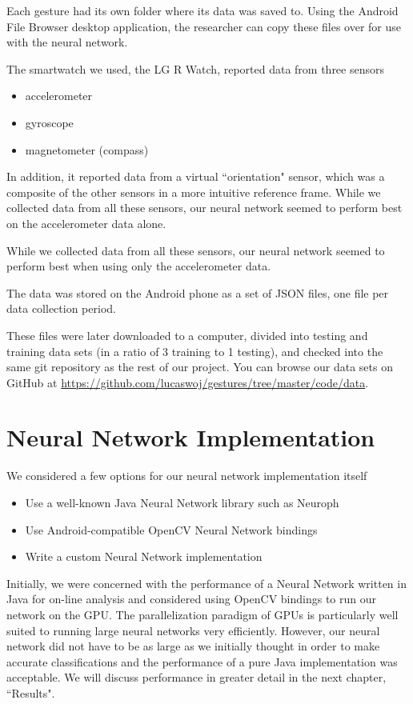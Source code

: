 \documentclass{report}
\begin{document}
Each gesture had its own folder where its data was saved to. Using the Android File Browser desktop application, the researcher can copy these files over for use with the neural network.

The smartwatch we used, the LG R Watch, reported data from three sensors
\begin{itemize}
\item accelerometer
\item gyroscope
\item magnetometer (compass)
\end{itemize}
In addition, it reported data from a virtual ``orientation" sensor, which was a composite of the other sensors in a more intuitive reference frame. While we collected data from all these sensors, our neural network seemed to perform best on the accelerometer data alone.

While we collected data from all these sensors, our neural network seemed to perform best when using only the accelerometer data.

The data was stored on the Android phone as a set of JSON files, one file per data collection period. %

These files were later downloaded to a computer, divided into testing and training data sets (in a ratio of 3 training to 1 testing), and checked into the same git repository as the rest of our project. You can browse our data sets on GitHub at \url{https://github.com/lucaswoj/gestures/tree/master/code/data}.

\section{Neural Network Implementation}


We considered a few options for our neural network implementation itself
\begin{itemize}
\item Use a well-known Java Neural Network library such as Neuroph
\item Use Android-compatible OpenCV Neural Network bindings
\item Write a custom Neural Network implementation
\end{itemize}

Initially, we were concerned with the performance of a Neural Network written in Java for on-line analysis and considered using OpenCV bindings to run our network on the GPU. The parallelization paradigm of GPUs is particularly well suited to running large neural networks very efficiently. However, our neural network did not have to be as large as we initially thought in order to make accurate classifications and the performance of a pure Java implementation was acceptable. We will discuss performance in greater detail in the next chapter, ``Results".
\end{document}
